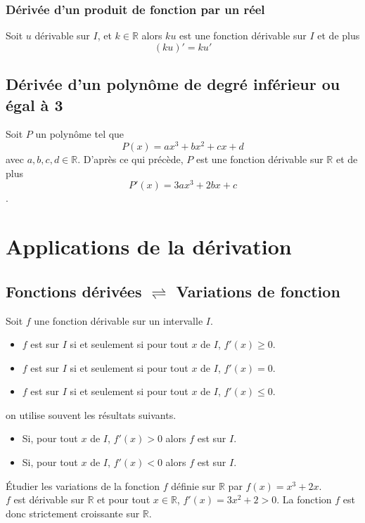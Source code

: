 \documentclass[french]{book}
\newcommand{\R}{\mathbb {R}}
\newcommand{\se}{\geq}
\newcommand{\ie}{\leq}
\begin{document}
\subsubsection*{Dérivée d'un produit de fonction par un réel}

\begin{prop}
Soit $u$ dérivable sur $I$, et $k \in \R$  alors $ku$ est une fonction dérivable sur $I$ et de plus $$(ku)'=ku'$$
\end{prop}

\subsection*{Dérivée d'un polynôme de degré inférieur ou égal à 3}

\begin{prop}
Soit $P$ un polynôme tel que $$P(x)=ax^3+bx^2+cx+d$$ avec $a,b,c,d \in \mathbb{R}$. D'après ce qui précède, $P$ est une fonction dérivable sur $\R$ et de plus $$P'(x)=3ax^3+2bx+c$$.
\end{prop}

\section{Applications de la dérivation}
\subsection{Fonctions dérivées $\rightleftharpoons$ Variations de fonction}
\begin{thm}
Soit $f$ une fonction dérivable sur un intervalle $I$.
\begin{itemize}
\item $f$ est  sur $I$ si et seulement si pour tout $x$ de $I$, $f'(x)\se 0$.
\item $f$ est  sur $I$ si et seulement si pour tout $x$ de $I$, $f'(x)=0$.
\item $f$ est  sur $I$ si et seulement si pour tout $x$ de $I$, $f'(x)\ie 0$.
\end{itemize}
\end{thm}

\begin{rem}
on utilise souvent les résultats suivants.
\begin{itemize}
\item Si, pour tout $x$ de $I$, $f'(x)>0$ alors $f$ est  sur $I$.
\item Si, pour tout $x$ de $I$, $f'(x)<0$ alors $f$ est  sur $I$.
\end{itemize}
\end{rem}

\begin{exemple}
Étudier les variations de la fonction $f$ définie sur $\R$ par $f(x)=x^{3}+2x$.\\

$f$ est dérivable sur $\R$ et pour tout $x\in \R$, $f'(x)=3x^{2}+2>0$.
La fonction $f$ est donc strictement croissante sur $\R$.
\end{exemple}
\end{document}
